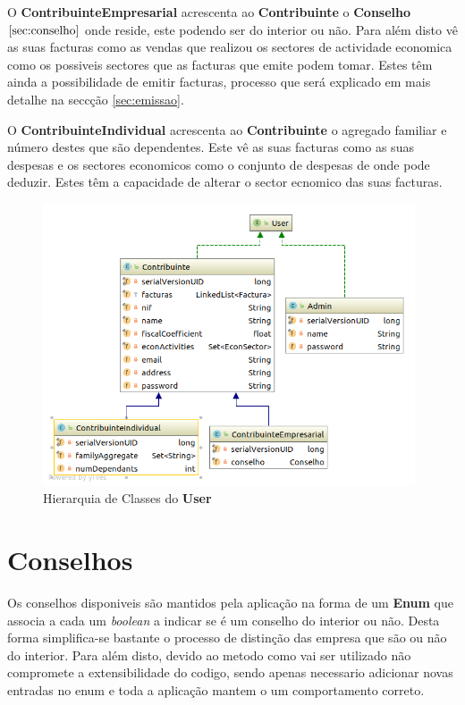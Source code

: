 \documentclass[12pt,a4paper]{report}
\begin{document}
    O \textbf{ContribuinteEmpresarial} acrescenta ao \textbf{Contribuinte}
    o \textbf{Conselho}\(\ref{sec:conselho}\) onde reside, este podendo ser
    do interior ou não. Para além disto vê as suas facturas como as vendas que
    realizou os sectores de actividade economica como os possiveis sectores que
    as facturas que emite podem tomar. Estes têm ainda a possibilidade de emitir
    facturas, processo que será explicado em mais detalhe na seccção
     \ref{sec:emissao}.

    O \textbf{ContribuinteIndividual} acrescenta ao \textbf{Contribuinte}
    o agregado familiar e número destes que são dependentes. Este vê as suas
    facturas como as suas despesas e os sectores economicos como o conjunto
    de despesas de onde pode deduzir. Estes têm a capacidade de alterar o
    sector ecnomico das suas facturas.

    \begin{figure}[H]
        \centering
        \includegraphics[width=11cm]{./images/UserHierarquy.png}
        \caption{Hierarquia de Classes do \textbf{User}}\label{fig:Hierarquia}
    \end{figure}

\section{Conselhos}
\label{sec:conselho}
    Os conselhos disponiveis são mantidos pela aplicação na forma de um
    \textbf{Enum} que associa a cada um \textit{boolean} a indicar se é um
    conselho do interior ou não. Desta forma simplifica-se bastante o processo
    de distinção das empresa que são ou não do interior. Para além disto, devido
    ao metodo como vai ser utilizado não compromete a extensibilidade do codigo,
    sendo apenas necessario adicionar novas entradas no enum e toda a aplicação
    mantem o um comportamento correto.
\end{document}
